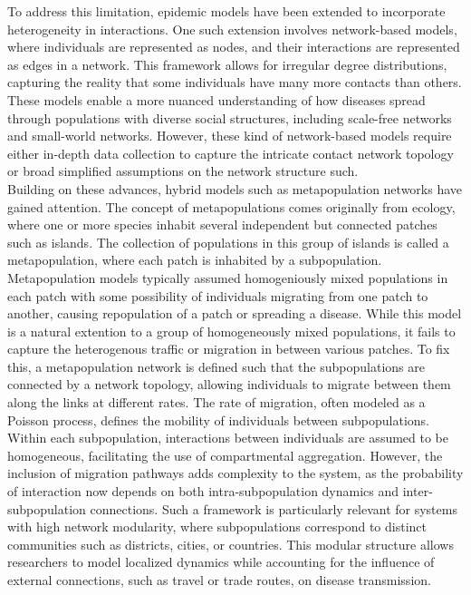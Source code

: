 To address this limitation, epidemic models have been extended to incorporate heterogeneity in interactions. One such extension involves network-based models, where individuals are represented as nodes, and their interactions are represented as edges in a network. This framework allows for irregular degree distributions, capturing the reality that some individuals have many more contacts than others. These models enable a more nuanced understanding of how diseases spread through populations with diverse social structures, including scale-free networks and small-world networks. However, these kind of network-based models require either in-depth data collection to capture the intricate contact network topology or broad simplified assumptions on the network structure such.    \\

Building on these advances, hybrid models such as metapopulation networks have gained attention. The concept of metapopulations comes originally from ecology, where one or more species inhabit several independent but connected patches such as islands. The collection of populations in this group of islands is called a metapopulation, where each patch is inhabited by a subpopulation. Metapopulation models typically assumed homogeniously mixed populations in each patch with some possibility of individuals migrating from one patch to another, causing repopulation of a patch or spreading a disease. While this model is a natural extention to a group of homogeneously mixed populations, it fails to capture the heterogenous traffic or migration in between various patches. To fix this, a metapopulation network is defined such that the subpopulations are connected by a network topology, allowing individuals to migrate between them along the links at different rates. The rate of migration, often modeled as a Poisson process, defines the mobility of individuals between subpopulations. Within each subpopulation, interactions between individuals are assumed to be homogeneous, facilitating the use of compartmental aggregation. However, the inclusion of migration pathways adds complexity to the system, as the probability of interaction now depends on both intra-subpopulation dynamics and inter-subpopulation connections. Such a framework is particularly relevant for systems with high network modularity, where subpopulations correspond to distinct communities such as districts, cities, or countries. This modular structure allows researchers to model localized dynamics while accounting for the influence of external connections, such as travel or trade routes, on disease transmission.\\

